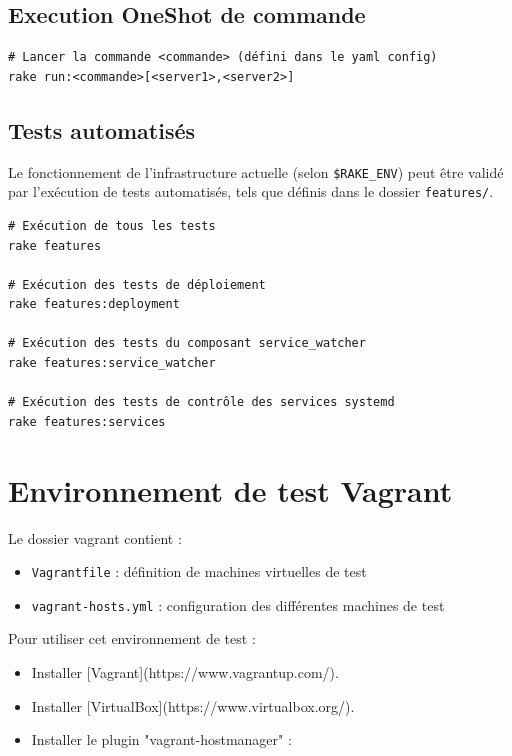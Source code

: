 \documentclass[a4paper,oneside,10pt]{article}
\begin{document}
\subsection{Execution OneShot de commande}

\begin{verbatim}
# Lancer la commande <commande> (défini dans le yaml config)
rake run:<commande>[<server1>,<server2>]
\end{verbatim}


\subsection{Tests automatisés}

Le fonctionnement de l'infrastructure actuelle (selon \verb!$RAKE_ENV!) peut être
validé par l'exécution de tests automatisés, tels que définis dans le dossier
\verb!features/!.

\begin{verbatim}
# Exécution de tous les tests
rake features

# Exécution des tests de déploiement
rake features:deployment

# Exécution des tests du composant service_watcher
rake features:service_watcher

# Exécution des tests de contrôle des services systemd
rake features:services
\end{verbatim}


\section{Environnement de test Vagrant}

Le dossier vagrant contient :
\begin{itemize}
	\item  \verb!Vagrantfile! : définition de machines virtuelles de test
	\item  \verb!vagrant-hosts.yml! : configuration des différentes machines de test
\end{itemize}

Pour utiliser cet environnement de test :

\begin{itemize}
\item Installer [Vagrant](https://www.vagrantup.com/).
\item Installer [VirtualBox](https://www.virtualbox.org/).
\item Installer le plugin "vagrant-hostmanager" :
\end{itemize}
\end{document}
